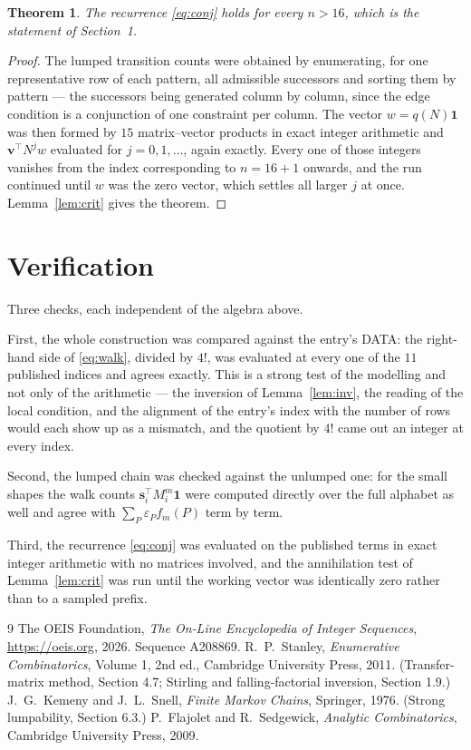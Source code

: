 \documentclass[11pt,a4paper]{article}
\theoremstyle{plain}
\newtheorem{theorem}{Theorem}
\theoremstyle{definition}
\begin{document}
\begin{theorem}
The recurrence \eqref{eq:conj} holds for every $n>16$, which is the statement of
Section~1.
\end{theorem}

\begin{proof}
The lumped transition counts were obtained by enumerating, for one representative row of
each pattern, all admissible successors and sorting them by pattern --- the successors being
generated column by column, since the edge condition is a conjunction of one constraint per
column. The vector $w=q(N)\mathbf{1}$ was then formed by $15$ matrix--vector products
in exact integer arithmetic and $\mathbf{v}^{\!\top}N^{j}w$ evaluated for
$j=0,1,\dots$, again exactly. Every one of those integers vanishes from the index
corresponding to $n=16+1$ onwards, and the run continued until $w$ was the zero vector,
which settles all larger $j$ at once. Lemma~\ref{lem:crit} gives the theorem.
\end{proof}

\section{Verification}

Three checks, each independent of the algebra above.

First, the whole construction was compared against the entry's DATA: the right-hand side of
\eqref{eq:walk}, divided by $4!$, was evaluated at every one of the $11$
published indices and agrees exactly. This is a strong test of the modelling and not only of
the arithmetic --- the inversion of Lemma~\ref{lem:inv}, the reading of the local
condition, and the alignment of the entry's index with the number of rows would each
show up as a mismatch, and the quotient by $4!$ came out an integer at every index.

Second, the lumped chain was checked against the unlumped one: for the small shapes the walk
counts $\mathbf{s}_i^{\!\top}M_i^{m}\mathbf{1}$ were computed directly over the full
alphabet as well and agree with $\sum_P\varepsilon_Pf_m(P)$ term by term.

Third, the recurrence \eqref{eq:conj} was evaluated on the published terms in exact integer
arithmetic with no matrices involved, and the annihilation test of Lemma~\ref{lem:crit} was
run until the working vector was identically zero rather than to a sampled prefix.

\begin{thebibliography}{9}
 The OEIS Foundation, \emph{The On-Line Encyclopedia of Integer
Sequences}, \url{https://oeis.org}, 2026. Sequence A208869.
 R.~P.~Stanley, \emph{Enumerative Combinatorics}, Volume 1, 2nd ed.,
Cambridge University Press, 2011. (Transfer-matrix method, Section 4.7; Stirling and
falling-factorial inversion, Section 1.9.)
 J.~G.~Kemeny and J.~L.~Snell, \emph{Finite Markov Chains}, Springer,
1976. (Strong lumpability, Section 6.3.)
 P.~Flajolet and R.~Sedgewick, \emph{Analytic Combinatorics}, Cambridge
University Press, 2009.
\end{thebibliography}
\end{document}
